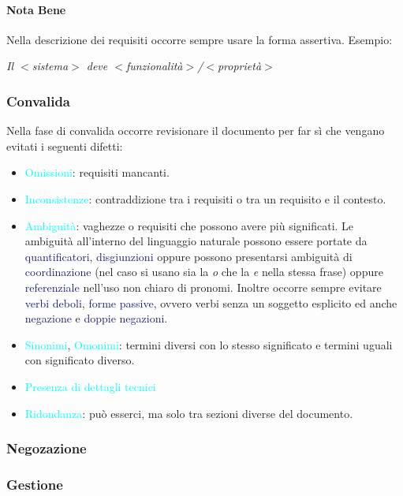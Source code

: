 \paragraph{Nota Bene} Nella descrizione dei requisiti occorre sempre usare la forma assertiva.
Esempio:
\begin{center}
    \emph{Il $<$sistema$>$ deve $<$funzionalità$>$/$<$proprietà$>$}
\end{center}

\subsubsection{Convalida}

Nella fase di convalida occorre revisionare il documento per far sì che vengano
evitati i seguenti difetti:

\begin{itemize}
    \item \textcolor{cyan}{Omissioni}: requisiti mancanti.
    \item \textcolor{cyan}{Inconsistenze}: contraddizione tra i requisiti o tra un requisito e il contesto.
    \item \textcolor{cyan}{Ambiguità}: vaghezze o requisiti che possono avere più significati. Le ambiguità all'interno del linguaggio naturale
        possono essere portate da \textcolor{MidnightBlue}{quantificatori}, \textcolor{MidnightBlue}{disgiunzioni}
        oppure possono presentarsi ambiguità di \textcolor{MidnightBlue}{coordinazione} (nel caso si usano sia la \emph{o} che la \emph{e} nella stessa frase) oppure 
        \textcolor{MidnightBlue}{referenziale} nell'uso non chiaro di pronomi.
        Inoltre occorre sempre evitare \textcolor{MidnightBlue}{verbi deboli}, \textcolor{MidnightBlue}{forme passive}, ovvero verbi senza un soggetto esplicito ed anche \textcolor{MidnightBlue}{negazione}
        e \textcolor{MidnightBlue}{doppie negazioni}.
    \item \textcolor{cyan}{Sinonimi}, \textcolor{cyan}{Omonimi}: termini diversi con lo stesso significato e termini uguali con significato diverso.
    \item \textcolor{cyan}{Presenza di dettagli tecnici}
    \item \textcolor{cyan}{Ridondanza}: può esserci, ma solo tra sezioni diverse del documento.
\end{itemize}

\subsubsection{Negozazione}

\subsubsection{Gestione}